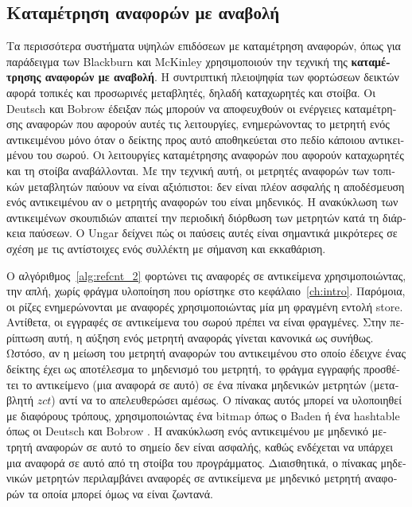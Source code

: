 \begin{greek}
\section{Καταμέτρηση αναφορών με αναβολή}
Τα περισσότερα συστήματα υψηλών επιδόσεων με καταμέτρηση
αναφορών, όπως για παράδειγμα των Blackburn και McKinley
\cite{DBLP:conf/oopsla/BlackburnM03} χρησιμοποιούν την τεχνική
της \textbf{καταμέτρησης αναφορών με αναβολή}. Η συντριπτική
πλειοψηφία των φορτώσεων δεικτών αφορά τοπικές και προσωρινές
μεταβλητές, δηλαδή καταχωρητές και στοίβα. Οι Deutsch και
Bobrow \cite{DBLP:journals/cacm/DeutschB76} έδειξαν πώς μπορούν
να αποφευχθούν οι ενέργειες καταμέτρησης αναφορών που αφορούν
αυτές τις λειτουργίες, ενημερώνοντας το μετρητή ενός αντικειμένου
μόνο όταν ο δείκτης προς αυτό αποθηκεύεται στο πεδίο κάποιου
αντικειμένου του σωρού. Οι λειτουργίες καταμέτρησης αναφορών
που αφορούν καταχωρητές και τη στοίβα αναβάλλονται. Με την
τεχνική αυτή, οι μετρητές αναφορών των τοπικών μεταβλητών
παύουν να είναι αξιόπιστοι: δεν είναι πλέον ασφαλής η
αποδέσμευση ενός αντικειμένου αν ο μετρητής αναφορών του
είναι μηδενικός. Η ανακύκλωση των αντικειμένων σκουπιδιών
απαιτεί την περιοδική διόρθωση των μετρητών κατά τη διάρκεια
παύσεων. Ο Ungar \cite{DBLP:conf/sde/Ungar84} δείχνει πώς
οι παύσεις αυτές είναι σημαντικά μικρότερες σε σχέση με τις
αντίστοιχες ενός συλλέκτη με σήμανση και εκκαθάριση.

Ο αλγόριθμος~\ref{alg:refcnt_2} φορτώνει τις αναφορές σε
αντικείμενα χρησιμοποιώντας, την απλή, χωρίς φράγμα υλοποίηση
 που ορίστηκε στο κεφάλαιο~\ref{ch:intro}.
Παρόμοια, οι ρίζες ενημερώνονται με αναφορές χρησιμοποιώντας
μία μη φραγμένη εντολή store. Αντίθετα, οι εγγραφές σε
αντικείμενα του σωρού πρέπει να είναι φραγμένες. Στην
περίπτωση αυτή, η αύξηση ενός μετρητή αναφοράς γίνεται
κανονικά ως συνήθως. Ωστόσο, αν η μείωση του μετρητή αναφορών
του αντικειμένου στο οποίο έδειχνε ένας δείκτης έχει ως
αποτέλεσμα το μηδενισμό του μετρητή, το φράγμα εγγραφής
 προσθέτει το αντικείμενο (μια αναφορά σε
αυτό) σε ένα πίνακα μηδενικών μετρητών (μεταβλητή $zct$)
αντί να το απελευθερώσει αμέσως. Ο πίνακας αυτός μπορεί
να υλοποιηθεί με διαφόρους τρόπους, χρησιμοποιώντας ένα
bitmap όπως ο Baden \cite{baden1983low} ή ένα hashtable
όπως οι Deutsch και Bobrow \cite{DBLP:journals/cacm/DeutschB76}.
H ανακύκλωση ενός αντικειμένου με μηδενικό μετρητή αναφορών
σε αυτό το σημείο δεν είναι ασφαλής, καθώς ενδέχεται να
υπάρχει μια αναφορά σε αυτό από τη στοίβα του προγράμματος.
Διαισθητικά, ο πίνακας μηδενικών μετρητών περιλαμβάνει
αναφορές σε αντικείμενα με μηδενικό μετρητή αναφορών τα
οποία μπορεί όμως να είναι ζωντανά.


\end{greek}
